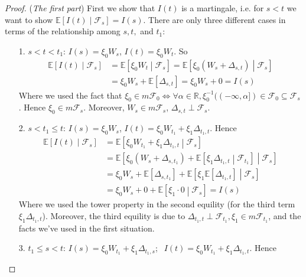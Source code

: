 \documentclass[a4paper, 10pt]{article}
\theoremstyle{definition}
\theoremstyle{hSol}
\begin{document}
\begin{proof} (\textit{The first part}) First we show that $I(t)$ is a martingale, i.e. for $s<t$ we want to show $\mathbb{E}\left[I(t)\middle|\mathcal{F}_s\right]=I(s)$. There are only three different cases in terms of the relationship among $s,t,$ and $t_1$: 
\begin{itemize}
	\item[1.] $s<t<t_1$: $I(s)= \xi_0 W_s$, $I(t) = \xi_0 W_t$. So
	\begin{equation}
		\begin{split}
			\mathbb{E}\left[I(t)\middle|\mathcal{F}_s\right] &= \mathbb{E}\left[\xi_0 W_t\middle|\mathcal{F}_s\right] = \mathbb{E}\left[\xi_0(W_s + \Delta_{s,t})\middle|\mathcal{F}_s\right] \\
			&= \xi_0 W_s + \mathbb{E}\left[\Delta_{s,t}\right] = \xi_0 W_s + 0= I(s)
		\end{split}
	\end{equation}
	Where we used the fact that $\xi_0 \in m \mathcal{F}_0 \iff \forall \alpha \in \mathbb{R}, \xi_0^{-1}((-\infty, \alpha]) \in \mathcal{F}_0 \subseteq \mathcal{F}_s$. Hence $\xi_0 \in m \mathcal{F}_s$. Moreover, $W_s \in m \mathcal{F}_s$, $\Delta_{s,t}\perp \mathcal{F}_s$. 
	\item[2.] $s<t_1\leq t$: $I(s)= \xi_0 W_s$, $I(t) = \xi_0 W_{t_1} + \xi_1 \Delta_{t_1, t}$. Hence
	\begin{equation}
		\begin{split}
			\mathbb{E}\left[I(t)\middle|\mathcal{F}_s\right] &= \mathbb{E}\left[ \xi_0 W_{t_1} + \xi_1 \Delta_{t_1, t}\middle|\mathcal{F}_s\right] \\
			&=\mathbb{E}\left[\xi_0(W_s + \Delta_{s,t_1}) + \mathbb{E}\left[\xi_1 \Delta_{t_1, t}\middle|\mathcal{F}_{t_1}\right]\middle|\mathcal{F}_s\right] \\
			&= \xi_0 W_s + \mathbb{E}\left[\Delta_{s,t_1}\right] + \mathbb{E}\left[\xi_{1} \mathbb{E}\left[\Delta_{t_1, t}\right]\middle|\mathcal{F}_s\right] \\
			&= \xi_0 W_s + 0 + \mathbb{E}\left[\xi_{1} \cdot 0\middle|\mathcal{F}_s\right] = I(s)
		\end{split}
	\end{equation}
	Where we used the tower property in the second equility (for the third term $\xi_1 \Delta_{t_1,t}$). Moreover, the third equility is due to $\Delta_{t_1, t}\perp \mathcal{F}_{t_1}, \xi_1 \in m \mathcal{F}_{t_1}$, and the facts we've used in the first situation.
	\item[3.] $t_1 \leq s < t$: $I(s)= \xi_0 W_{t_1} + \xi_1 \Delta_{t_1, s}$; $~~I(t) = \xi_0 W_{t_1} + \xi_1 \Delta_{t_1, t}$. Hence

\end{itemize}
\end{proof}
\end{document}
